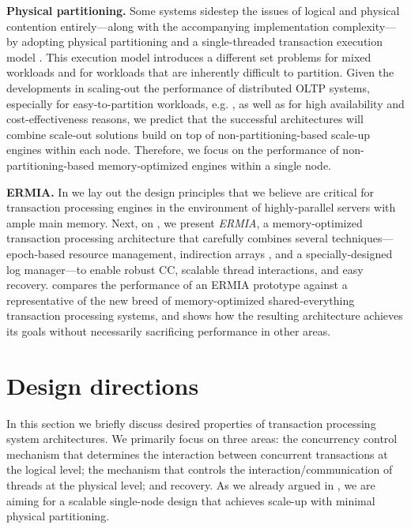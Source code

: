 \vspace{2mm}
{\bf Physical partitioning.} Some systems sidestep the issues of logical and physical contention entirely---along with the accompanying implementation complexity---by adopting physical partitioning and a single-threaded transaction execution model \cite{Kallman+08,KemperN11}. This execution model introduces a different set problems for mixed workloads and for workloads that are inherently difficult to partition.  Given the developments in scaling-out the performance of distributed OLTP systems, especially for easy-to-partition workloads, e.g. \cite{Corbett+12,BailisFHGS14,ThomsonA10}, as well as for high availability and cost-effectiveness reasons, we predict that the successful architectures will combine scale-out solutions build on top of non-partitioning-based scale-up engines within each node.
Therefore, we focus on the performance of non-partitioning-based memory-optimized engines within a single node.

\vspace{2mm}
{\bf ERMIA.} 
In  we lay out the design principles that we believe are critical for transaction processing engines in the environment of highly-parallel servers with ample main memory. Next, on , we present {\em ERMIA}, a memory-optimized transaction processing architecture that carefully combines several techniques---epoch-based resource management, indirection arrays \cite{SadoghiRCB13}, and a specially-designed log manager---to enable robust CC, scalable thread interactions, and easy recovery.  
 compares the performance of an ERMIA prototype against a representative of the new breed of memory-optimized shared-everything transaction processing systems, and shows how the resulting architecture achieves its goals without necessarily sacrificing performance in other areas.

\section{Design directions}

In this section we briefly discuss desired properties of transaction processing system architectures. We primarily focus on three areas: the concurrency control mechanism that determines the interaction between concurrent transactions at the logical level; the mechanism that controls the interaction/communication of threads at the physical level; and recovery. As we already argued in , we are aiming for a scalable single-node design that achieves scale-up with minimal physical partitioning.  

